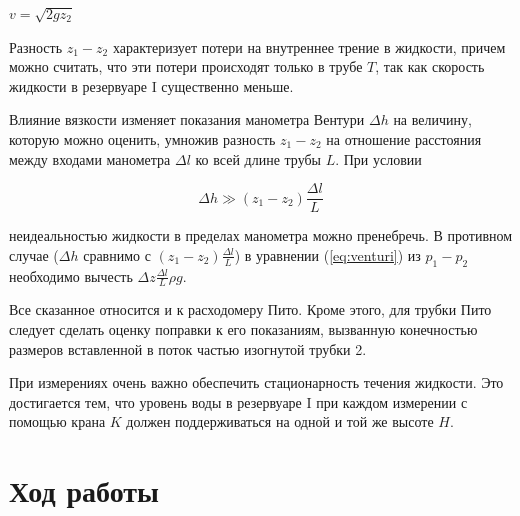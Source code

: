 \documentclass[12pt]{article}
\begin{document}
\begin{center}
$ v=\sqrt{2gz_2} $
\end{center}

Разность \( z_1 - z_2 \) характеризует потери на внутреннее трение в жидкости, причем можно считать, что эти потери происходят только в трубе \( T \), так как скорость жидкости в резервуаре I существенно меньше.

Влияние вязкости изменяет показания манометра Вентури \( \Delta h \) на величину, которую можно оценить, умножив разность \( z_1 - z_2 \) на отношение расстояния между входами манометра \( \Delta l \) ко всей длине трубы \( L \). При условии

\[
\Delta h \gg (z_1 - z_2) \frac{\Delta l}{L}
\]

неидеальностью жидкости в пределах манометра можно пренебречь. В противном случае (\( \Delta h \) сравнимо с \( (z_1 - z_2) \frac{\Delta l}{L} \)) в уравнении (\ref{eq:venturi}) из \( p_1 - p_2 \) необходимо вычесть \( \Delta z \frac{\Delta l}{L} \rho g \).

Все сказанное относится и к расходомеру Пито. Кроме этого, для трубки Пито следует сделать оценку поправки к его показаниям, вызванную конечностью размеров вставленной в поток частью изогнутой трубки 2.

При измерениях очень важно обеспечить стационарность течения жидкости. Это достигается тем, что уровень воды в резервуаре I при каждом измерении с помощью крана \( K \) должен поддерживаться на одной и той же высоте \( H \). 

\section*{Ход работы}
\end{document}
